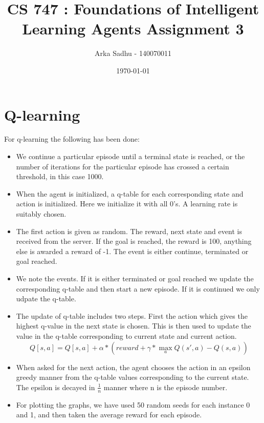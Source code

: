 \documentclass{article}
\title{CS 747 : Foundations of Intelligent Learning Agents Assignment 3}
\author{Arka Sadhu - 140070011}
\date{\today}
\begin{document}
\maketitle

\section{Q-learning}
For q-learning the following has been done:
\begin{itemize}
\item We continue a particular episode until a terminal state is reached, or the number of iterations for the particular episode has crossed a certain threshold, in this case 1000.
\item When the agent is initialized, a q-table for each corresponding state and action is initialized. Here we initialize it with all 0's. A learning rate is suitably chosen.
\item The first action is given as random. The reward, next state and event is received from the server. If the goal is reached, the reward is 100, anything else is awarded a reward of -1. The event is either continue, terminated or goal reached.
\item We note the events. If it is either terminated or goal reached we update the corresponding q-table and then start a new episode. If it is continued we only udpate the q-table.
\item The update of q-table includes two steps. First the action which gives the highest q-value in the next state is chosen. This is then used to update the value in the q-table corresponding to current state and current action.
  $$Q[s, a] = Q[s, a] + \alpha * (reward +  \gamma * \max_a Q(s', a) - Q(s, a))$$
\item When asked for the next action, the agent chooses the action in an epsilon greedy manner from the q-table values corresponding to the current state. The epsilon is decayed in $\frac{1}{n}$ manner where n is the episode number.
\item For plotting the graphs, we have used 50 random seeds for each instance 0 and 1, and then taken the average reward for each episode.
\end{itemize}
\end{document}
